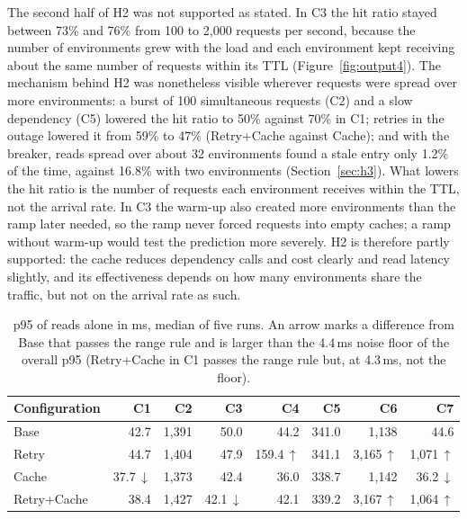 \documentclass[10pt]{article}
\begin{document}
The second half of H2 was not supported as stated. In C3 the hit ratio stayed
between 73\% and 76\% from 100 to 2{,}000 requests per second, because the
number of environments grew with the load and each environment kept receiving
about the same number of requests within its TTL (Figure~\ref{fig:output4}).
The mechanism behind H2 was nonetheless visible wherever requests were spread
over more environments: a burst of 100 simultaneous requests (C2) and a slow
dependency (C5) lowered the hit ratio to 50\% against 70\% in C1; retries in
the outage lowered it from 59\% to 47\% (Retry+Cache against Cache); and with
the breaker, reads spread over about 32 environments found a stale entry only
1.2\% of the time, against 16.8\% with two environments (Section~\ref{sec:h3}).
What lowers the hit ratio is the number of requests each environment receives
within the TTL, not the arrival rate. In C3 the warm-up also created more
environments than the ramp later needed, so the ramp never forced requests into
empty caches; a ramp without warm-up would test the prediction more severely.
H2 is therefore partly supported: the cache reduces dependency calls and cost
clearly and read latency slightly, and its effectiveness depends on how many
environments share the traffic, but not on the arrival rate as such.

\begin{table}[htbp]
\centering
\footnotesize
\begin{tabular}{@{}lrrrrrrr@{}}
\toprule
\textbf{Configuration} & \textbf{C1} & \textbf{C2} & \textbf{C3} & \textbf{C4} & \textbf{C5} & \textbf{C6} & \textbf{C7} \\
\midrule
Base & 42.7 & 1,391 & 50.0 & 44.2 & 341.0 & 1,138 & 44.6 \\
Retry & 44.7 & 1,404 & 47.9 & 159.4\,$\uparrow$ & 341.1 & 3,165\,$\uparrow$ & 1,071\,$\uparrow$ \\
Cache & 37.7\,$\downarrow$ & 1,373 & 42.4 & 36.0 & 338.7 & 1,142 & 36.2\,$\downarrow$ \\
Retry+Cache & 38.4 & 1,427 & 42.1\,$\downarrow$ & 42.1 & 339.2 & 3,167\,$\uparrow$ & 1,064\,$\uparrow$ \\
\bottomrule
\end{tabular}
\caption{p95 of reads alone in ms, median of five runs. An arrow marks a
difference from Base that passes the range rule and is larger than the 4.4\,ms
noise floor of the overall p95 (Retry+Cache in C1 passes the range rule but,
at 4.3\,ms, not the floor).}
\label{tab:readp95}
\end{table}
\end{document}
